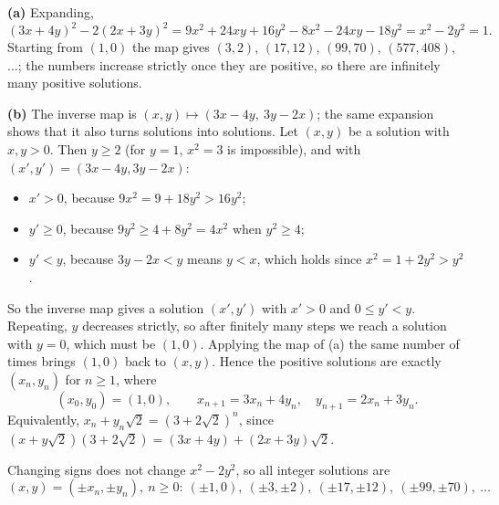 \textbf{(a)} Expanding,
\[(3x+4y)^2-2(2x+3y)^2=9x^2+24xy+16y^2-8x^2-24xy-18y^2=x^2-2y^2=1.\]
Starting from $(1,0)$ the map gives $(3,2)$, $(17,12)$, $(99,70)$, $(577,408)$, $\dots$; the numbers increase strictly once they are positive, so there are infinitely many positive solutions.

\textbf{(b)} The inverse map is $(x,y)\mapsto(3x-4y,\ 3y-2x)$; the same expansion shows that it also turns solutions into solutions. Let $(x,y)$ be a solution with $x,y>0$. Then $y\ge2$ (for $y=1$, $x^2=3$ is impossible), and with $(x',y')=(3x-4y,3y-2x)$:
\begin{itemize}
\item $x'>0$, because $9x^2=9+18y^2>16y^2$;
\item $y'\ge0$, because $9y^2\ge4+8y^2=4x^2$ when $y^2\ge4$;
\item $y'<y$, because $3y-2x<y$ means $y<x$, which holds since $x^2=1+2y^2>y^2$.
\end{itemize}
So the inverse map gives a solution $(x',y')$ with $x'>0$ and $0\le y'<y$. Repeating, $y$ decreases strictly, so after finitely many steps we reach a solution with $y=0$, which must be $(1,0)$. Applying the map of (a) the same number of times brings $(1,0)$ back to $(x,y)$. Hence the positive solutions are exactly $(x_n,y_n)$ for $n\ge1$, where
\[(x_0,y_0)=(1,0),\qquad x_{n+1}=3x_n+4y_n,\quad y_{n+1}=2x_n+3y_n.\]
Equivalently, $x_n+y_n\sqrt2=\left(3+2\sqrt2\right)^n$, since $(x+y\sqrt2)(3+2\sqrt2)=(3x+4y)+(2x+3y)\sqrt2$.

Changing signs does not change $x^2-2y^2$, so all integer solutions are
\[\boxed{(x,y)=(\pm x_n,\pm y_n),\ n\ge0}:\ (\pm1,0),\ (\pm3,\pm2),\ (\pm17,\pm12),\ (\pm99,\pm70),\ \dots\]
